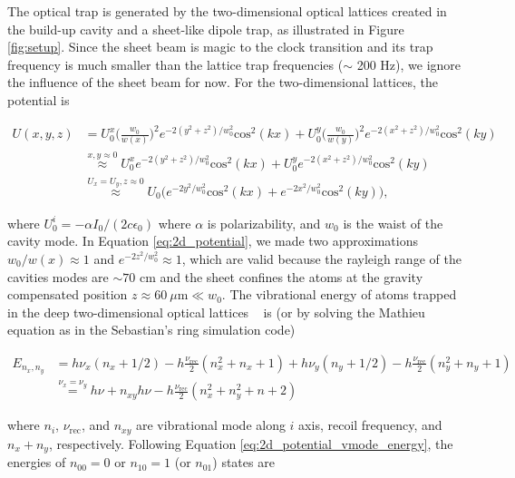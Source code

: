 \documentclass[bibnotes]{article}
\begin{document}
	The optical trap is generated by the two-dimensional optical lattices created in the build-up cavity and a sheet-like dipole trap, as illustrated in Figure \ref{fig:setup}. Since the sheet beam is magic to the clock transition and its trap frequency is much smaller than the lattice trap frequencies ($\sim$ 200 Hz), we ignore the influence of the sheet beam for now. For the two-dimensional lattices, the potential is

	\begin{align}
	U(x,y,z)&=U^{x}_{0}\bigg(\frac{w_{0}}{w(x)}\bigg)^{2}e^{-2(y^{2}+z^{2})/w^{2}_{0}}\text{cos}^{2}(kx)+U^{y}_{0}\bigg(\frac{w_{0}}{w(y)}\bigg)^{2}e^{-2(x^{2}+z^{2})/w^{2}_{0}}\text{cos}^{2}(ky) \nonumber \\
	&\stackrel{x,y \approx 0}{\approx} U^{x}_{0}e^{-2(y^{2}+z^{2})/w^{2}_{0}}\text{cos}^{2}(kx)+U^{y}_{0}e^{-2(x^{2}+z^{2})/w^{2}_{0}}\text{cos}^{2}(ky) \nonumber\\
	&\stackrel{U_{x}=U_{y}, z\approx{0}}{\approx} U_{0}\bigg(e^{-2y^{2}/w^{2}_{0}}\text{cos}^{2}(kx)+e^{-2x^{2}/w^{2}_{0}}\text{cos}^{2}(ky)\bigg),
	\label{eq:2d_potential}
	\end{align}

	\noindent where $U^{i}_{0} = - \alpha I_{0} / (2c\epsilon_{0})$ where $\alpha$ is polarizability, and $w_{0}$ is the waist of the cavity mode. In Equation \ref{eq:2d_potential}, we made two approximations $w_{0}/w(x)\approx1$ and $e^{-2z^{2}/w^{2}_{0}}\approx 1$, which are valid because the rayleigh range of the cavities modes are $\sim 70$ cm and the sheet confines the atoms at the gravity compensated position $z\approx 60 \ \mu \text{m} \ll  w_{0}$. The vibrational energy of atoms trapped in the deep two-dimensional optical lattices ~\cite{blatt09} is (or by solving the Mathieu equation as in the Sebastian's ring simulation code)

	\begin{align}\label{eq:2d_potential_vmode_energy}
	E_{n_x,n_y}&=h\nu_{x}(n_{x}+1/2)-h\frac{\nu_{\text{rec}}}{2}(n^{2}_{x}+n_{x}+1)
	+h\nu_{y}(n_{y}+1/2)-h\frac{\nu_{\text{rec}}}{2}(n^{2}_{y}+n_{y}+1) \nonumber\\
	&\stackrel{\nu_x=\nu_y}=h\nu + n_{xy}h\nu - h\frac{\nu_{\text{rec}}}{2}(n^{2}_x+n^{2}_y+n+2)
	\end{align}

	\noindent where $n_{i}$, $\nu_{\text{rec}}$, and $n_{xy}$ are vibrational mode along $i$ axis, recoil frequency, and $n_x+n_y$, respectively. Following Equation \ref{eq:2d_potential_vmode_energy}, the energies of $n_{00}=0$ or $n_{10}=1$ (or $n_{01}$) states are
\end{document}
